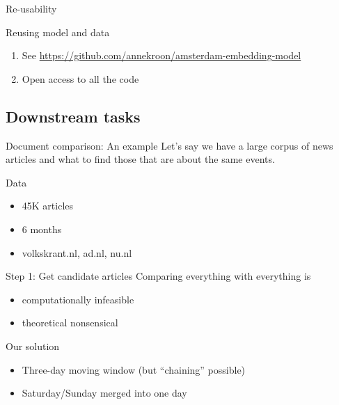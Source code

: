 \begin{frame}{Re-usability}
  \begin{block}{Reusing model and data}
    \begin{enumerate}
    \item See \url{https://github.com/annekroon/amsterdam-embedding-model}
    \item Open access to all the code
    \end{enumerate}
  \end{block}
\end{frame}



\subsection{Downstream tasks}


\begin{frame}{Document comparison: An example \parencite{Trilling2021}}
  Let's say we have a large corpus of news articles and what to find those that are about the same events.
  
\end{frame}


\begin{frame}{Data}
  \begin{itemize}
  \item 45K articles
  \item 6 months
  \item volkskrant.nl, ad.nl, nu.nl
  \end{itemize}
\end{frame}



\begin{frame}{Step 1: Get candidate articles}
  Comparing everything with everything is
  \begin{itemize}
  \item computationally infeasible
  \item theoretical nonsensical
  \end{itemize}
  
  \begin{block}{Our solution}
    \begin{itemize}
    \item Three-day moving window (but ``chaining'' possible)
    \item  Saturday/Sunday merged into one day
    \end{itemize}
  \end{block}
  
\end{frame}





